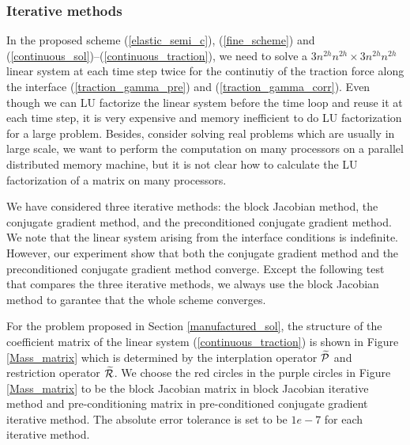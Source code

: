 \subsubsection{Iterative methods}\label{iterative_section}
In the proposed scheme (\ref{elastic_semi_c}), (\ref{fine_scheme}) and (\ref{continuous_sol})--(\ref{continuous_traction}), we need to solve a $3n^{2h}n^{2h}\times 3n^{2h}n^{2h}$ linear system at each time step twice for the continutiy of the traction force along the interface (\ref{traction_gamma_pre}) and (\ref{traction_gamma_corr}). Even though we can LU factorize the linear system before the time loop and reuse it at each time step, it is very expensive and memory inefficient to do LU factorization for a large problem. Besides, consider solving real problems which are usually in large scale, we want to perform the computation on many processors on a parallel distributed memory machine, but it is not clear how to calculate the LU factorization of a matrix on many processors. 

We have considered three iterative methods: the block Jacobian method, the conjugate gradient method, and the preconditioned conjugate gradient method. We note that the linear system arising from the interface conditions is indefinite. However, our experiment show that both the conjugate gradient method and the preconditioned conjugate gradient method converge. Except the following test that compares the three iterative methods, we always use the block Jacobian method to garantee that the whole scheme converges. 

For the problem proposed in Section \ref{manufactured_sol}, the structure of the coefficient matrix of the linear system (\ref{continuous_traction}) is shown in Figure \ref{Mass_matrix} which is determined by the interplation operator $\widetilde{\mathcal{P}}$ and restriction operator $\widetilde{\mathcal{R}}$. We choose the red circles in the purple circles in Figure \ref{Mass_matrix} to be the block Jacobian matrix in block Jacobian iterative method and pre-conditioning matrix in pre-conditioned conjugate gradient iterative method. The absolute error tolerance is set to be $1e-7$ for each iterative method.

